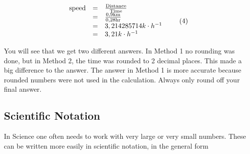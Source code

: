     \begin{equation}
    \begin{array}{ccc}\hfill \text{speed}& =& \frac{\text{Distance}}{\text{Time}}\hfill \\ & =& \frac{0,9\text{km}}{0,28\text{hr}}\hfill \\ & =& 3,214285714k\ensuremath{\cdot}{h}^{-1}\hfill \\ & =& 3,21k\ensuremath{\cdot}{h}^{-1}\hfill \end{array}\tag{4}
      \end{equation}
        \par 
        \label{m30853*id64591}You will see that we get two different answers. In Method 1 no rounding was done, but in Method 2, the time was rounded to 2 decimal places. This made a big difference to the answer. The answer in Method 1 is more accurate because rounded numbers were not used in the calculation. Always only round off your final answer.\par 
      \label{m30853*uid18}
            \subsection*{Scientific Notation}
            \nopagebreak
        \label{m30853*id64607}In Science one often needs to work with very large or very small numbers. These can be written more easily in scientific notation, in the general form\par 
        \label{m30853*id64612}\nopagebreak\noindent{}
          
